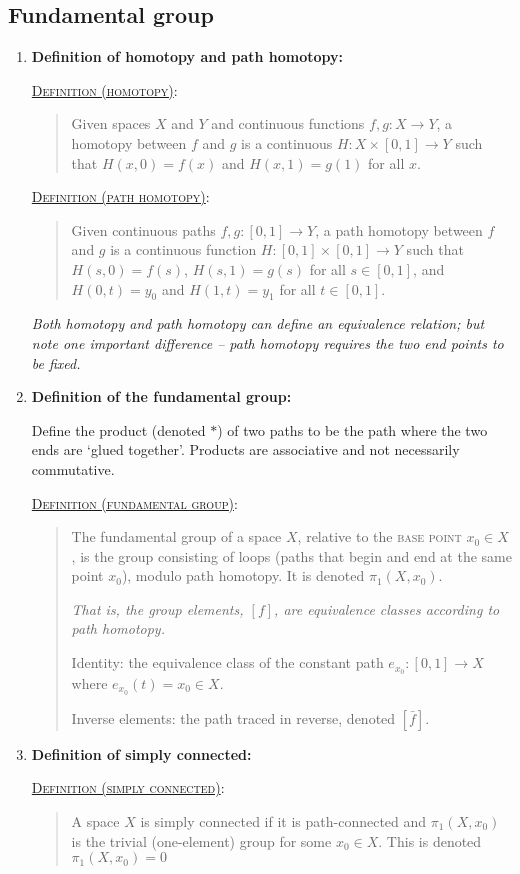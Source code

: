 \documentclass[letterpaper, 12pt]{article}
\newcommand{\defn}[2]{\textsc{\underline{Definition (#1)}:}\begin{quote} #2\end{quote}}
\begin{document}
    \subsection{Fundamental group}
        \begin{enumerate}[resume]
        \item \textbf{Definition of homotopy and path homotopy:}

            \defn{homotopy}{Given spaces $X$ and $Y$ and continuous functions $f,g:X\to Y$, a homotopy between $f$ and $g$ is a continuous $H:X\times[0,1]\to Y$ such that $H(x,0) = f(x)$ and $H(x,1) = g(1)$ for all $x$.}

            \defn{path homotopy}{Given continuous paths $f,g:[0,1]\to Y$, a path homotopy between $f$ and $g$ is a continuous function $H:[0,1]\times[0,1]\to Y$ such that $H(s,0) = f(s)$, $H(s,1) = g(s)$ for all $s\in[0,1]$, and $H(0,t) = y_0$ and $H(1,t) = y_1$ for all $t\in[0,1]$.}

            \textit{Both homotopy and path homotopy can define an equivalence relation; but note one important difference -- path homotopy requires the two end points to be fixed.}
        \item \textbf{Definition of the fundamental group:}

            Define the product (denoted $*$) of two paths to be the path where the two ends are `glued together'. Products are associative and not necessarily commutative.

            \defn{fundamental group}{The fundamental group of a space $X$, relative to the \textsc{base point} $x_0\in X$, is the group consisting of loops (paths that begin and end at the same point $x_0$), modulo path homotopy. It is denoted $\pi_1(X, x_0)$.

            \textit{That is, the group elements, $[f]$, are equivalence classes according to path homotopy.}

            Identity: the equivalence class of the constant path $e_{x_0} : [0,1]\to X$ where $e_{x_0}(t) = x_0 \in X$.

            Inverse elements: the path traced in reverse, denoted $[\bar f]$.}
        \item \textbf{Definition of simply connected:}

            \defn{simply connected}{A space $X$ is simply connected if it is path-connected and $\pi_1(X,x_0)$ is the trivial (one-element) group for some $x_0\in X$. This is denoted $\pi_1(X,x_0) = 0$

}
\end{enumerate}
\end{document}
